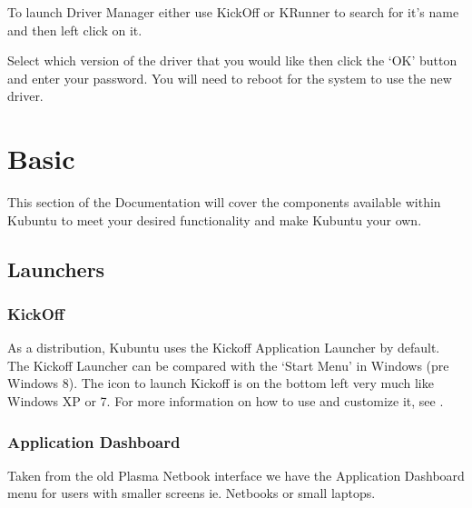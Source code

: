 \documentclass[letterpaper,10pt,english]{sphinxmanual}
\begin{document}
To launch Driver Manager either use KickOff or KRunner to search for it’s name and then left click on it.


Select which version of the driver that you would like then click the ‘OK’ button and enter your password. You will need to reboot for the system to use the new driver.


\chapter{Basic}
\label{\detokenize{docs/basic:basic}}\label{\detokenize{docs/basic:basic-link}}\label{\detokenize{docs/basic::doc}}
This section of the Documentation will cover the components available within Kubuntu to meet your desired functionality and make Kubuntu your own.


\section{Launchers}
\label{\detokenize{docs/basic:launchers}}

\subsection{KickOff}
\label{\detokenize{docs/basic:kickoff}}
As a  distribution, Kubuntu uses the Kickoff Application Launcher by default. The Kickoff Launcher can be compared with the ‘Start Menu’ in Windows (pre Windows 8). The icon to launch Kickoff is on the bottom left very much like Windows XP or 7. For more information on how to use and customize it, see .


\subsection{Application Dashboard}
\label{\detokenize{docs/basic:application-dashboard}}

Taken from the old Plasma Netbook interface we have the Application Dashboard menu for users with smaller screens ie. Netbooks or small laptops.
\end{document}
